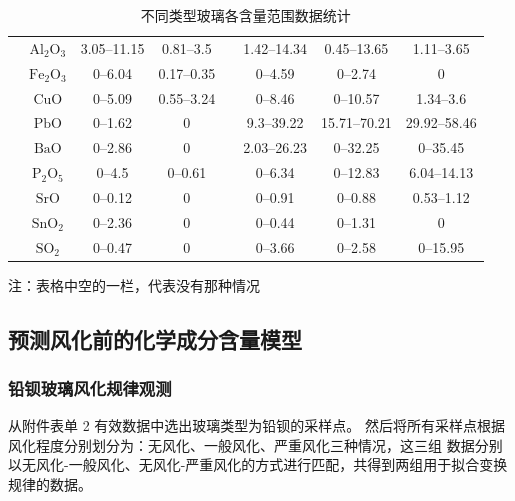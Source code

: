 \documentclass[withoutpreface,bwprint]{cumcmthesis} %
\begin{document}
\begin{table}[!htb]
\begin{tabular}{|c|c|c|c|c|c|c|c|}
        \cline{2-8}
                                   & $\mathrm{Al_2O_3}$       & 3.05--11.15              & 0.81--3.5    &              & 1.42--14.34 & 0.45--13.65  & 1.11--3.65   \\
        \cline{2-8}
                                   & $\mathrm{Fe_2O_3}$       & 0--6.04                  & 0.17--0.35   &              & 0--4.59     & 0--2.74      & 0            \\
        \cline{2-8}
                                   & $\mathrm{CuO}$           & 0--5.09                  & 0.55--3.24   &              & 0--8.46     & 0--10.57     & 1.34--3.6    \\
        \cline{2-8}
                                   & $\mathrm{PbO}$           & 0--1.62                  & 0            &              & 9.3--39.22  & 15.71--70.21 & 29.92--58.46 \\
        \cline{2-8}
                                   & $\mathrm{BaO}$           & 0--2.86                  & 0            &              & 2.03--26.23 & 0--32.25     & 0--35.45     \\
        \cline{2-8}
                                   & $\mathrm{P_2O_5}$        & 0--4.5                   & 0--0.61      &              & 0--6.34     & 0--12.83     & 6.04--14.13  \\
        \cline{2-8}
                                   & $\mathrm{SrO}$           & 0--0.12                  & 0            &              & 0--0.91     & 0--0.88      & 0.53--1.12   \\
        \cline{2-8}
                                   & $\mathrm{SnO_2}$         & 0--2.36                  & 0            &              & 0--0.44     & 0--1.31      & 0            \\
        \cline{2-8}
                                   & $\mathrm{SO_2}$          & 0--0.47                  & 0            &              & 0--3.66     & 0--2.58      & 0--15.95     \\
        \hline
    \end{tabular}
    {\small 注：表格中空的一栏，代表没有那种情况}
    \caption{不同类型玻璃各含量范围数据统计}
    \label{tab:range}
\end{table}

\subsection{预测风化前的化学成分含量模型}%
\subsubsection{铅钡玻璃风化规律观测}
从附件表单 2 有效数据中选出玻璃类型为铅钡的采样点。
然后将所有采样点根据风化程度分别划分为：无风化、一般风化、严重风化三种情况，这三组
数据分别以无风化-一般风化、无风化-严重风化的方式进行匹配，共得到两组用于拟合变换规律的数据。
\end{document}
